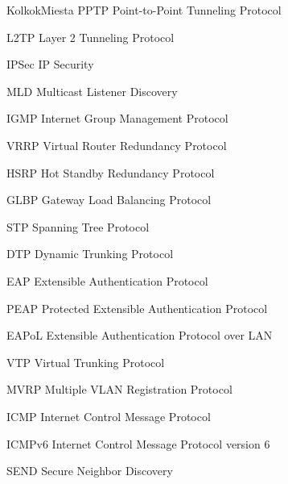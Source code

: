 \begin{seznamzkratek}{KolkokMiesta}
	{PPTP} %
	{Point-to-Point Tunneling Protocol} %
	
	{L2TP} %
	{Layer 2 Tunneling Protocol} %
	
	{IPSec} %
	{IP Security} %

	{MLD} %
	{Multicast Listener Discovery} %
	
	{IGMP} %
	{Internet Group Management Protocol} %
	
	{VRRP} %
	{Virtual Router Redundancy Protocol} %

	{HSRP} %
	{Hot Standby Redundancy Protocol} %
	
	{GLBP} %
	{Gateway Load Balancing Protocol} %
	
	{STP} %
	{Spanning Tree Protocol} %

	{DTP} %
	{Dynamic Trunking Protocol} %
	
	{EAP} %
	{Extensible Authentication Protocol} %
	
	{PEAP} %
	{Protected Extensible Authentication Protocol} %
	
	{EAPoL} %
	{Extensible Authentication Protocol over LAN} %
	
	{VTP} %
	{Virtual Trunking Protocol} %

	{MVRP} %
	{Multiple VLAN Registration Protocol} %
	
	{ICMP} %
	{Internet Control Message Protocol} %

	{ICMPv6} %
	{Internet Control Message Protocol version 6} %
	
	{SEND} %
	{Secure Neighbor Discovery} %

\end{seznamzkratek}
